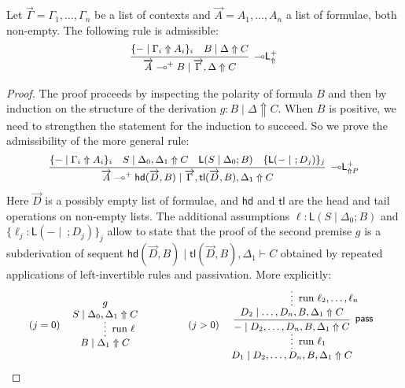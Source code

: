 \documentclass[runningheads]{llncs}
\renewcommand{\vec}{\overrightarrow}
\newcommand{\lleft}{{\multimap}\mathsf{L}}
\newcommand{\pass}{\mathsf{pass}}
\newcommand{\lolliL}{\lleft}
\newcommand{\lolli}{\multimap}
\renewcommand{\L}{\mathsf{L}}
\newcommand{\proofbox}[1]{\begin{tabular}{l} #1 \end{tabular}}
\newcommand{\up}{\Uparrow}
\begin{document}
\begin{proposition}\label{prop:lolliL}
  Let $\vec{\Gamma} = \Gamma_1,\dots,\Gamma_n$ be a list of contexts and $\vec{A} = A_1,\dots,A_n$ a list of formulae, both non-empty.
  The following rule is admissible:
  \[
  \small
  \begin{array}{c}
    \infer[\lolliL^+_\up]{\vec{A} \lolli^+ B \mid \vec{\Gamma} , \Delta \up C}{
      \{ - \mid \Gamma_i \up A_i \}_{i}
      &
      B \mid \Delta \up C
    }
  \end{array}
  \]
\end{proposition}
\begin{proof}
  The proof proceeds by inspecting the polarity of formula $B$ and then by induction on the structure of the derivation $g : B \mid \Delta \up C$. When $B$ is positive, we need to strengthen the statement for the induction to succeed. So we prove the admissibility of the more general rule:
  \[
  \small
  \begin{array}{c}
    \infer[\lolliL^+_{\up P}]{\vec{A} \lolli^+ \mathsf{hd}(\vec{D},B) \mid \vec{\Gamma} , \mathsf{tl}(\vec{D},B),\Delta_1 \up C}{
      \{ - \mid \Gamma_i \up A_i \}_{i}
      &
      S \mid \Delta_0,\Delta_1 \up C
      &
      \L(S\mid \Delta_0;B)
      &
      \{\L(-\mid ~ ;D_j)\}_j
    }
  \end{array}
  \]
  Here $\vec{D}$ is a possibly empty list of formulae, and $\mathsf{hd}$ and $\mathsf{tl}$ are the head and tail operations on non-empty lists.
  The additional assumptions $\ell : \L(S\mid \Delta_0;B)$ and $\{\ell_j : \L(-\mid ~ ;D_j)\}_j$  %
  allow to state that the proof of the second premise $g$ is a subderivation of sequent $\mathsf{hd}(\vec{D},B) \mid \mathsf{tl}(\vec{D},B),\Delta_1 \vdash C$ obtained by repeated applications of left-invertible rules and passivation. More explicitly:
  \[
  \footnotesize
  \arraycolsep=.7cm%
  \begin{array}{cc}
    (j = 0) \;\;
  \proofbox{
    \infer*[\text{run } \ell]{B \mid \Delta_1 \up C}{
      \deduce{S \mid \Delta_0,\Delta_1 \up C}{g}
    }}
  &
  (j >0) \;\;
  \proofbox{
     \infer*[\text{run } \ell_1]{D_1 \mid D_2,\dots,D_n ,B,\Delta_1 \up C}{
       \infer[\pass]{- \mid D_2,\dots,D_n ,B,\Delta_1 \up C}{
         \infer*[\text{run } \ell_2,\dots,\ell_n]{D_2 \mid \dots,D_n ,B,\Delta_1 \up C}{
}}}}
\end{array}\]
\end{proof}
\end{document}
